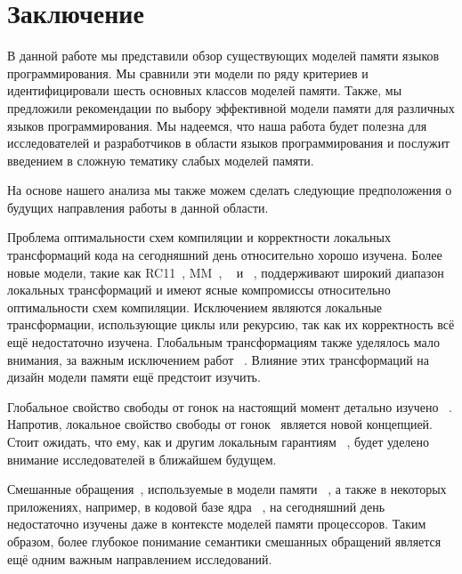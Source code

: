 \section{Заключение}
\label{sec:conclusion}

В данной работе мы представили обзор существующих моделей памяти языков программирования. 
Мы сравнили эти модели  по ряду критериев 
и идентифицировали шесть основных классов моделей памяти. 
Также, мы предложили рекомендации по выбору эффективной модели памяти 
для различных языков программирования. 
Мы надеемся, что наша работа будет полезна 
для исследователей и разработчиков в области языков программирования
и послужит введением в сложную тематику слабых моделей памяти. 


На основе нашего анализа мы также можем сделать следующие предположения 
о будущих направления работы в данной области. 

Проблема оптимальности схем компиляции и корректности локальных трансформаций кода 
на сегодняшний день относительно хорошо изучена.
Более новые модели, такие как 
RC11~\cite{Lahav-al:PLDI17}, \OCaml MM~\cite{Dolan-al:PLDI18},
\Promising~\cite{Kang-al:POPL17,Lee-al:PLDI20}
и \Weakestmo~\cite{Chakraborty-Vafeiadis:POPL19},
поддерживают широкий диапазон локальных трансформаций 
и имеют ясные компромиссы относительно оптимальности схем компиляции. 
Исключением являются  локальные трансформации, 
использующие  циклы или рекурсию, так как их корректность всё ещё недостаточно изучена. 
Глобальным трансформациям также уделялось мало внимания, за важным исключением работ~%
\cite{PichonPharabod-Sewell:POPL16, Lee-al:PLDI20}.
Влияние этих трансформаций на дизайн модели памяти 
ещё предстоит  изучить.

Глобальное свойство свободы от гонок на настоящий момент детально изучено~%
\cite{Manson-al:POPL05, Batty-al:ESOP15, Lahav-al:PLDI17, Kang-al:POPL17}. 
Напротив, локальное свойство свободы от гонок~\cite{Dolan-al:PLDI18}  
является новой концепцией. 
Стоит ожидать, что ему, как и другим локальным гарантиям~%
\cite{Dodds-al:ESOP18, Jagadeesan-al:OOPSLA2020, Cho-al:PLDI21}, 
будет уделено  внимание исследователей в ближайшем будущем. 

Смешанные обращения~\cite{Flur-al:POPL17}, 
используемые в модели памяти \JS~\cite{Watt-al:PLDI2020}, 
а также в некоторых приложениях, например, в кодовой базе 
ядра \Linux~\cite{Flur-al:POPL17},
на сегодняшний день недостаточно изучены 
даже в контексте моделей памяти процессоров. 
Таким образом, более глубокое понимание семантики смешанных обращений 
является ещё одним важным направлением исследований. 

